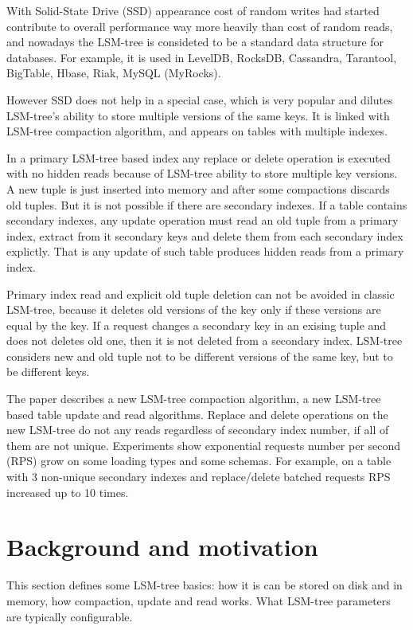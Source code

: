 \documentclass{vldb}
\begin{document}
With Solid-State Drive (SSD) appearance cost of random writes had started
contribute to overall performance way more heavily than cost of random reads,
and nowadays the LSM-tree is consideted to be a standard data structure for
databases. For example, it is used in LevelDB, RocksDB, Cassandra, Tarantool,
BigTable, Hbase, Riak, MySQL (MyRocks).

However SSD does not help in a special case, which is very popular and dilutes
LSM-tree's ability to store multiple versions of the same keys. It is linked
with LSM-tree compaction algorithm, and appears on tables with multiple indexes.

In a primary LSM-tree based index any replace or delete operation is executed
with no hidden reads because of LSM-tree ability to store multiple key versions.
A new tuple is just inserted into memory and after some compactions discards old
tuples. But it is not possible if there are secondary indexes. If a table
contains secondary indexes, any update operation must read an old tuple from a
primary index, extract from it secondary keys and delete them from each
secondary index explictly. That is any update of such table produces hidden
reads from a primary index.

Primary index read and explicit old tuple deletion can not be avoided in classic
LSM-tree, because it deletes old versions of the key only if these versions are
equal by the key. If a request changes a secondary key in an exising tuple and
does not deletes old one, then it is not deleted from a secondary index.
LSM-tree considers new and old tuple not to be different versions of the same
key, but to be different keys.

The paper describes a new LSM-tree compaction algorithm, a new LSM-tree based
table update and read algorithms. Replace and delete operations on the new
LSM-tree do not any reads regardless of secondary index number, if all of them
are not unique. Experiments show exponential requests number per second (RPS)
grow on some loading types and some schemas. For example, on a table with 3
non-unique secondary indexes and replace/delete batched requests RPS increased
up to 10 times.

\section{Background and motivation}
This section defines some LSM-tree basics: how it is can be stored on disk and
in memory, how compaction, update and read works. What LSM-tree parameters are
typically configurable.
\end{document}

